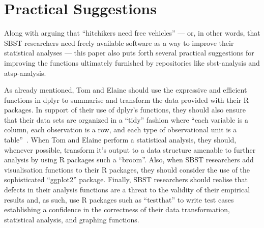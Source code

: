 
\vspace*{-.5em}

\section{Practical Suggestions}
\label{sec:suggestions}


Along with arguing that ``hitchikers need free vehicles'' --- or, in other words, that SBST researchers need freely
available software as a way to improve their statistical analyses --- this paper also puts forth several practical
suggestions for improving the functions ultimately furnished by repositories like sbst-analysis and atsp-analysis.

As already mentioned, Tom and Elaine should use the expressive and efficient functions in dplyr to summarise and
transform the data provided with their R packages. In support of their use of dplyr's functions, they should also ensure
that their data sets are organized in a ``tidy'' fashion where ``each variable is a column, each observation is a row,
and each type of observational unit is a table''~\cite{Wickham2014}. When Tom and Elaine perform a statistical analysis,
they should, whenever possible, transform it's output to a data structure amenable to further analysis by using R
packages such a ``broom''. Also, when SBST researchers add visualisation functions to their R packages, they should
consider the use of the sophisticated ``ggplot2'' package. Finally, SBST researchers should realise that defects in
their analysis functions are a threat to the validity of their empirical results and, as such, use R packages such as
``testthat'' to write test cases establishing a confidence in the correctness of their data transformation, statistical
analysis, and graphing functions.


